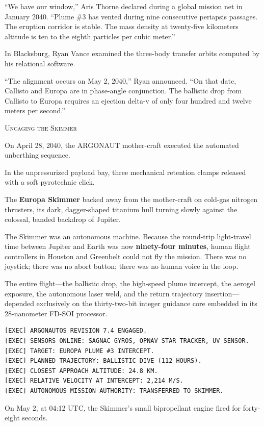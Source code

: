 \documentclass[12pt,twoside,openright]{book}
\newcommand{\sceneheader}[1]{%
  \par\vspace{1.8em}%
  {\noindent\centering\scshape\large #1\par}%
  \vspace{1.0em}%
  \noindent%
}
\newcommand{\dinkus}{%
  \par\vspace{1.2em}%
  {\noindent\centering{\large $\ast\quad\ast\quad\ast$}\par}%
  \vspace{1.2em}%
  \noindent%
}
\begin{document}
``We have our window,'' Aris Thorne declared during a global mission net
in January 2040. ``Plume \#3 has vented during nine consecutive
periapsis passages. The eruption corridor is stable. The mass density at
twenty-five kilometers altitude is ten to the eighth particles per cubic
meter.''

In Blacksburg, Ryan Vance examined the three-body transfer orbits
computed by his relational software.

``The alignment occurs on May 2, 2040,'' Ryan announced. ``On that date,
Callisto and Europa are in phase-angle conjunction. The ballistic drop
from Callisto to Europa requires an ejection delta-v of only four
hundred and twelve meters per second.''

\dinkus

\sceneheader{Uncaging the Skimmer}

On April 28, 2040, the ARGONAUT mother-craft executed the automated
unberthing sequence.

In the unpressurized payload bay, three mechanical retention clamps
released with a soft pyrotechnic click.

The \textbf{Europa Skimmer} backed away from the mother-craft on
cold-gas nitrogen thrusters, its dark, dagger-shaped titanium hull
turning slowly against the colossal, banded backdrop of Jupiter.

The Skimmer was an autonomous machine. Because the round-trip
light-travel time between Jupiter and Earth was now \textbf{ninety-four
minutes}, human flight controllers in Houston and Greenbelt could not
fly the mission. There was no joystick; there was no abort button; there
was no human voice in the loop.

The entire flight---the ballistic drop, the high-speed plume intercept,
the aerogel exposure, the autonomous laser weld, and the return
trajectory insertion---depended exclusively on the thirty-two-bit
integer guidance core embedded in its 28-nanometer FD-SOI processor.

\begin{lstlisting}
[EXEC] ARGONAUTOS REVISION 7.4 ENGAGED.
[EXEC] SENSORS ONLINE: SAGNAC GYROS, OPNAV STAR TRACKER, UV SENSOR.
[EXEC] TARGET: EUROPA PLUME #3 INTERCEPT.
[EXEC] PLANNED TRAJECTORY: BALLISTIC DIVE (112 HOURS).
[EXEC] CLOSEST APPROACH ALTITUDE: 24.8 KM.
[EXEC] RELATIVE VELOCITY AT INTERCEPT: 2,214 M/S.
[EXEC] AUTONOMOUS MISSION AUTHORITY: TRANSFERRED TO SKIMMER.
\end{lstlisting}

On May 2, at 04:12 UTC, the Skimmer's small bipropellant engine fired
for forty-eight seconds.
\end{document}
